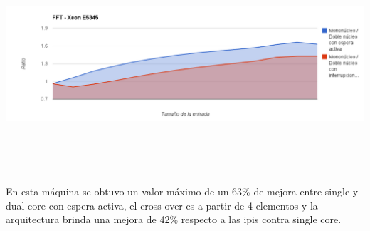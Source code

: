 \begin{center}
	    \includegraphics[height=8cm]{images/fft_xeon_e5345.png}
	\end{center}

En esta máquina se obtuvo un valor máximo de un 63\% de mejora entre single y dual core con espera activa, el cross-over es a partir de 4 elementos y la arquitectura brinda una mejora de 42\% respecto a las ipis contra single core.
